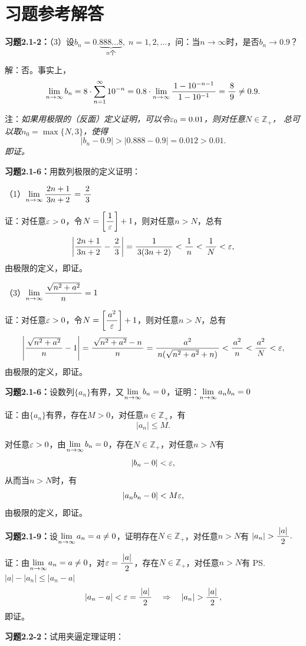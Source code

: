 \section*{习题参考解答}

{\bf
习题2.1-2：}（3）设$b_n=0.\underbrace{888\ldots8}_{n\mbox{个}},
\;n=1,2,\ldots$，问：当$n\to\infty$时，是否$b_n\to0.9$？

解：否。事实上，
$$\limn{b_n}=8\cdot\sumn
10^{-n}=0.8\cdot\limn\df{1-10^{-n-1}}{1-10^{-1}}=\df89\ne 0.9.$$

注：{\it 如果用极限的（反面）定义证明，可以令$\e_0=0.01$，则对任意$N\in\mathbb{Z}_+$，
总可以取$n_0=\max\{N,3\}$，使得}
$$|b_n-0.9|>|0.888-0.9|=0.012>0.01.$$
{\it 即证。}

\bigskip

{\bf 习题2.1-6：}用数列极限的定义证明：

\bigskip

（1）$\limn\df{2n+1}{3n+2}=\df23$

证：对任意$\e>0$，令$N=\left[\df1{\e}\right]+1$，则对任意$n>N$，总有
$$\left|\df{2n+1}{3n+2}-\df23\right|=\df1{3(3n+2)}<\df1n<\df1N<\e,$$
由极限的定义，即证。

\bigskip

（3）$\limn\df{\sqrt{n^2+a^2}}n=1$

证：对任意$\e>0$，令$N=\left[\df{a^2}{\e}\right]+1$，则对任意$n>N$，总有
$$\left|\df{\sqrt{n^2+a^2}}n-1\right|
=\df{\sqrt{n^2+a^2}-n}n=\df{a^2}{n(\sqrt{n^2+a^2}+n)}
<\df{a^2}n<\df{a^2}N<\e,$$
由极限的定义，即证。

\bigskip

{\bf 习题2.1-6：}设数列$\{a_n\}$有界，又$\limn b_n=0$，证明：$\limn a_nb_n=0$

证：由$\{a_n\}$有界，存在$M>0$，对任意$n\in\mathbb{Z}_+$，有
$$|a_n|\leq M.$$

对任意$\e>0$，由$\limn b_n=0$，存在$N\in\mathbb{Z}_+$，对任意$n>N$有
$$|b_n-0|<\e,$$
从而当$n>N$时，有
$$|a_nb_n-0|<M\e,$$
由极限的定义，即证。

\bigskip

{\bf 习题2.1-9：}设$\limn a_n=a\ne0$，证明存在$N\in\mathbb{Z}_+$，对任意$n>N$有
$|a_n|>\df{|a|}2.$

证：由$\limn a_n=a\ne0$，对$\e=\df{|a|}2$，存在$N\in\mathbb{Z}_+$，对任意$n>N$有
\ps{$|a|-|a_n|\leq|a_n-a|$}
$$|a_n-a|<\e=\df{|a|}2\quad\Rightarrow\quad |a_n|>\df{|a|}2,$$
即证。

\bigskip

{\bf 习题2.2-2：}试用夹逼定理证明：

